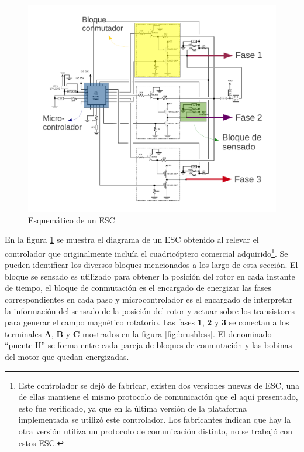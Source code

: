 \documentclass[main]{subfiles}
\begin{document}
\begin{figure}[h!]
	\centering
	\includegraphics[width=1\textwidth]{./pics_eleccion_hardware/diagrama_ESC.pdf}
	\vspace{-10pt}
	\caption{Esquemático de un ESC}
	\label{fig:diagrama_esc}
\end{figure}

En la figura \ref{fig:diagrama_esc} se muestra el diagrama de un ESC obtenido al relevar el controlador que originalmente incluía el cuadricóptero comercial adquirido\footnote{Este controlador se dej\'o de fabricar, existen dos versiones nuevas de ESC, una de ellas mantiene el mismo protocolo de comunicaci\'on que el aqu\'i presentado, esto fue verificado, ya que en la \'ultima versi\'on de la plataforma implementada se utiliz\'o este controlador.  Los fabricantes indican que hay la otra versi\'on utiliza un protocolo de comunicaci\'on distinto, no se trabaj\'o con estos ESC. }. Se pueden identificar los diversos bloques mencionados a los largo de esta sección. El bloque se sensado es utilizado para obtener la posición del rotor en cada instante de tiempo, el bloque de conmutación es el encargado de energizar las fases correspondientes en cada paso y microcontrolador es el encargado de interpretar la información del sensado de la posición del rotor y actuar sobre los transistores para generar el campo magnético rotatorio. Las fases \textbf{1}, \textbf{2} y \textbf{3} se conectan a los terminales \textbf{A}, \textbf{B} y \textbf{C} mostrados en la figura \ref{fig:brushless}. El denominado ``puente H'' se forma entre cada pareja de bloques de conmutación y las bobinas del motor que quedan energizadas.
\end{document}
